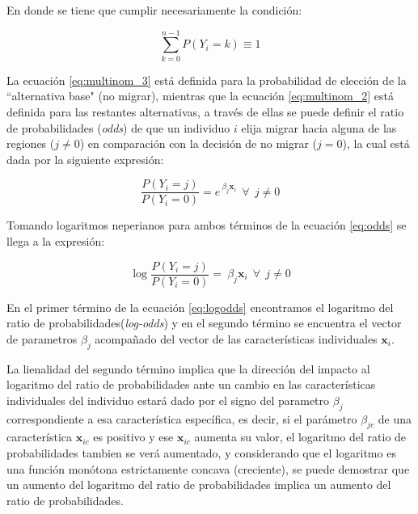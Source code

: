 \documentclass[12pt,a4paper]{article}
\begin{document}
En donde se tiene que cumplir necesariamente la condición:
\begin {center}
\begin{equation}\label{eq:multinom_4}
\sum_{k=0}^{n-1}P{(Y_{i}=k)}\equiv1
\end{equation}
\end {center}

La ecuación \ref{eq:multinom_3} está definida para la probabilidad de elección de la ``alternativa base" (no migrar), mientras que la ecuación \ref{eq:multinom_2} está definida para las restantes alternativas, a través de ellas se puede definir el ratio de probabilidades (\textit{odds}) de que un individuo $i$ elija migrar hacia alguna de las regiones ($j\neq0$) en comparación con la decisión de no migrar ($j=0$), la cual está dada por la siguiente expresión:
\begin{center}
\begin{equation}\label{eq:odds}
\frac{P{(Y_{i}=j)}}{P{(Y_{i}=0)}}=e^{\ \beta_{j} \textbf{x}_{i}} \ \ \forall \ \ j\neq0
\end{equation}
\end {center}
Tomando logaritmos neperianos para ambos términos de la ecuación \ref{eq:odds} se llega a la expresión:
\begin{center}
\begin{equation}\label{eq:logodds}
\log\frac{P{(Y_{i}=j)}}{P{(Y_{i}=0)}}=\ \beta_{j} \textbf{x}_{i} \ \ \forall \ \ j\neq0
\end{equation}
\end {center}

En el primer término de la ecuación \ref{eq:logodds} encontramos el logaritmo del ratio de probabilidades(\textit{log-odds}) y en el segundo término se encuentra el vector de parametros $\beta_{j}$ acompañado del vector de las características individuales $\textbf{x}_{i}$. 

La lienalidad del segundo término implica que la dirección del impacto al logaritmo del ratio de probabilidades ante  un cambio en las características individuales del individuo estará dado por el signo del parametro $\beta_{j}$ correspondiente a esa característica específica, es decir, si el parámetro  $\beta_{jc}$ de una característica $\textbf{x}_{ic}$ es positivo y ese $\textbf{x}_{ic}$  aumenta su valor, el logaritmo del ratio de probabilidades tambien se verá aumentado, y considerando que el logaritmo es una función monótona estrictamente concava (creciente), se puede demostrar que un aumento del logaritmo del ratio de probabilidades implica un aumento del ratio de probabilidades.
\end{document}
